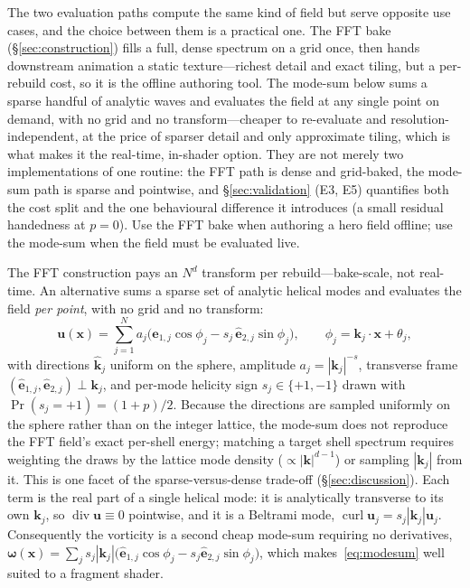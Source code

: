 \documentclass[11pt]{article}
\theoremstyle{remark}
\newcommand{\bx}{\mathbf{x}}
\newcommand{\bk}{\mathbf{k}}
\newcommand{\bu}{\mathbf{u}}
\newcommand{\bomega}{\boldsymbol{\omega}}
\newcommand{\khat}{\hat{\bk}}
\newcommand{\ehat}{\hat{\mathbf{e}}}
\DeclareMathOperator{\curl}{curl}
\DeclareMathOperator{\dvg}{div}
\begin{document}
The two evaluation paths compute the same kind of field but serve opposite use cases, and the
choice between them is a practical one. The FFT bake (\S\ref{sec:construction}) fills a full,
dense spectrum on a grid once, then hands downstream animation a static texture---richest detail
and exact tiling, but a per-rebuild cost, so it is the offline authoring tool. The mode-sum
below sums a sparse handful of analytic waves and evaluates the field at any single point on
demand, with no grid and no transform---cheaper to re-evaluate and resolution-independent, at
the price of sparser detail and only approximate tiling, which is what makes it the real-time,
in-shader option. They are not merely two implementations of one routine: the FFT path is dense
and grid-baked, the mode-sum path is sparse and pointwise, and \S\ref{sec:validation}
(E3, E5) quantifies both the cost split and the one behavioural difference it introduces (a
small residual handedness at $p=0$). Use the FFT bake when authoring a hero field offline; use
the mode-sum when the field must be evaluated live.

The FFT construction pays an $N^d$ transform per rebuild---bake-scale, not real-time. An
alternative sums a sparse set of analytic helical modes and evaluates the field \emph{per
point}, with no grid and no transform:
\begin{equation}
\bu(\bx)=\sum_{j=1}^{N} a_j\big(\ehat_{1,j}\cos\phi_j - s_j\,\ehat_{2,j}\sin\phi_j\big),
\qquad \phi_j=\bk_j\cdot\bx+\theta_j,
\label{eq:modesum}
\end{equation}
with directions $\khat_j$ uniform on the sphere, amplitude $a_j=|\bk_j|^{-s}$, transverse
frame $(\ehat_{1,j},\ehat_{2,j})\perp\bk_j$, and per-mode helicity sign $s_j\in\{+1,-1\}$
drawn with $\Pr(s_j=+1)=(1+p)/2$. Because the directions are sampled uniformly on the
sphere rather than on the integer lattice, the mode-sum does not reproduce the FFT field's
exact per-shell energy; matching a target shell spectrum requires weighting the draws by the
lattice mode density ($\propto|\bk|^{d-1}$) or sampling $|\bk_j|$ from it. This is one facet
of the sparse-versus-dense trade-off (\S\ref{sec:discussion}). Each term is the real part of a single helical mode: it is
analytically transverse to its own $\bk_j$, so $\dvg\bu\equiv0$ pointwise, and it is a
Beltrami mode, $\curl\bu_j=s_j|\bk_j|\bu_j$. Consequently the vorticity is a second cheap
mode-sum requiring no derivatives,
$\bomega(\bx)=\sum_j s_j|\bk_j|\big(\ehat_{1,j}\cos\phi_j - s_j\ehat_{2,j}\sin\phi_j\big)$,
which makes~\eqref{eq:modesum} well suited to a fragment shader.
\end{document}
